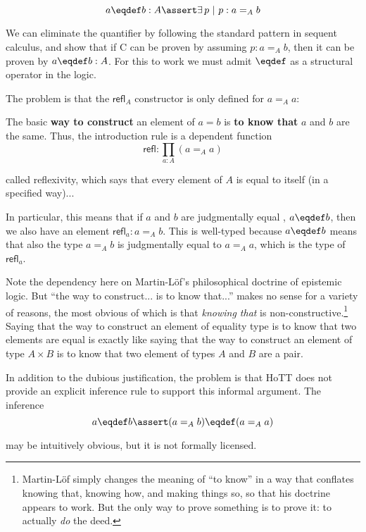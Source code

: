 \documentclass{article}
\begin{document}
\[a\defeq b:A \linfer\exists\,p\ |\ p : a=_A b\]

We can eliminate the quantifier by following the standard pattern in
sequent calculus, and show that if C can be proven by assuming
\(p:a=_A b\), then it can be proven by \(a\defeq b:A\). For this to
work we must admit \(\defeq\) as a structural operator in the logic.

The problem is that the
\(\textsf{refl}_A\) constructor is only defined for \(a=_A a\):

\begin{displayquote}
    The basic \textbf{way to construct} an element of \(a=b\) is
    \textbf{to know that} \(a\) and \(b\) are the same. Thus, the
    introduction rule is a dependent function
  \[\textsf{refl} : ∏_{a:A}(a=_A a)\]

  called reflexivity, which says that every element of \(A\) is equal
  to itself (in a specified way)...

  In particular, this means that if \(a\) and \(b\) are judgmentally
  equal {}, \(a\defeq b\), then we also
  have an element \(\textsf{refl}_a : a=_A b\). This is well-typed
  because \(a\defeq b\) means that also the type \(a=_A b\) is
  judgmentally equal {} to \(a=_A a\),
    which is the type of \(\textsf{refl}_a\).
\end{displayquote}

Note the dependency here on Martin-Löf's philosophical doctrine of
epistemic logic. But ``the way to construct... is to know that...''
makes no sense for a variety of reasons, the most obvious of which is
that \textit{knowing that} is non-constructive.\footnote{Martin-Löf
simply changes the meaning of ``to know'' in a way that conflates
knowing that, knowing how, and making things so, so that his doctrine
appears to work. But the only way to prove something is to prove it:
to actually \textit{do} the deed.} Saying that the way to construct an
element of equality type is to know that two elements are equal is
exactly like saying that the way to construct an element of type
\(A\times B\) is to know that two element of types \(A\) and \(B\) are
a pair.

In addition to the dubious justification, the problem is that HoTT
does not provide an explicit inference rule to support this informal
argument. The inference
\[a\defeq b \linfer (a=_A b) \defeq (a=_A a)\]

may be intuitively obvious, but it is not formally licensed.
\end{document}
